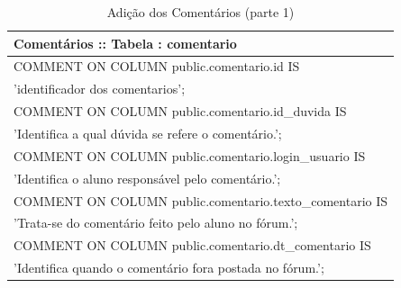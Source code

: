 \documentclass[graduacao,brazil]{ThesisPUC}
\begin{document}
\begin{table}[H]
{\begin{tabular}{|l|}
    Comentários :: Tabela : comentario                                                                                                                                                                                                                                                                                                                                                                                                                                                                                                                                                                                                    \\ \hline
    COMMENT ON COLUMN public.comentario.id IS \\'identificador dos comentarios'; \\COMMENT ON COLUMN public.comentario.id\_duvida IS \\'Identifica a qual dúvida se refere o comentário.'; \\COMMENT ON COLUMN public.comentario.login\_usuario IS \\'Identifica o aluno responsável pelo comentário.'; \\COMMENT ON COLUMN public.comentario.texto\_comentario IS \\'Trata-se do comentário feito pelo aluno no fórum.'; \\COMMENT ON COLUMN public.comentario.dt\_comentario IS \\'Identifica quando o comentário fora postada no fórum.';                                                                                              \\ \hline
    \end{tabular}
    }
    \caption {Adi\c{c}\~{a}o dos Coment\'{a}rios (parte 1)}
\end{table}

\end{document}
